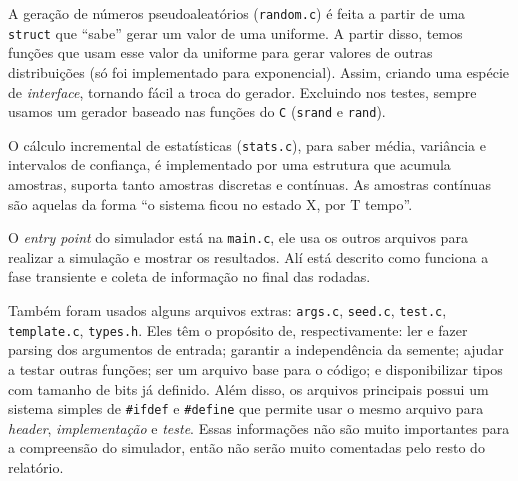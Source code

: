 \documentclass[a4paper]{article}
\newcommand{\arq}{\texttt}
\newcommand{\inlcode}{\texttt}
\newcommand{\lang}{\texttt}
\begin{document}
A geração de números pseudoaleatórios (\arq{random.c})
é feita a partir de uma \inlcode{struct} que ``sabe''
gerar um valor de uma uniforme.
A partir disso, temos funções que usam esse valor da uniforme
para gerar valores de outras distribuições
(só foi implementado para exponencial).
Assim, criando uma espécie de \emph{interface},
tornando fácil a troca do gerador.
Excluindo nos testes, sempre usamos
um gerador baseado nas funções do \lang{C}
(\inlcode{srand} e \inlcode{rand}).

O cálculo incremental de estatísticas (\arq{stats.c}),
para saber média, variância e intervalos de confiança,
é implementado por uma estrutura que acumula amostras,
suporta tanto amostras discretas e contínuas.
As amostras contínuas são aquelas da forma
``o sistema ficou no estado X, por T tempo''.

O \emph{entry point} do simulador está na \arq{main.c},
ele usa os outros arquivos para realizar a simulação
e mostrar os resultados.
Alí está descrito como funciona a fase transiente e
coleta de informação no final das rodadas.

Também foram usados alguns arquivos extras:
\arq{args.c}, \arq{seed.c},
\arq{test.c}, \arq{template.c}, \arq{types.h}.
Eles têm o propósito de, respectivamente:
ler e fazer parsing dos argumentos de entrada;
garantir a independência da semente;
ajudar a testar outras funções;
ser um arquivo base para o código; e
disponibilizar tipos com tamanho de bits já definido.
Além disso, os arquivos principais possui um sistema simples
de \inlcode{\#ifdef} e \inlcode{\#define}
que permite usar o mesmo arquivo para
\emph{header}, \emph{implementação} e \emph{teste}.
Essas informações não são muito importantes
para a compreensão do simulador,
então não serão muito comentadas pelo resto do relatório.
\end{document}
